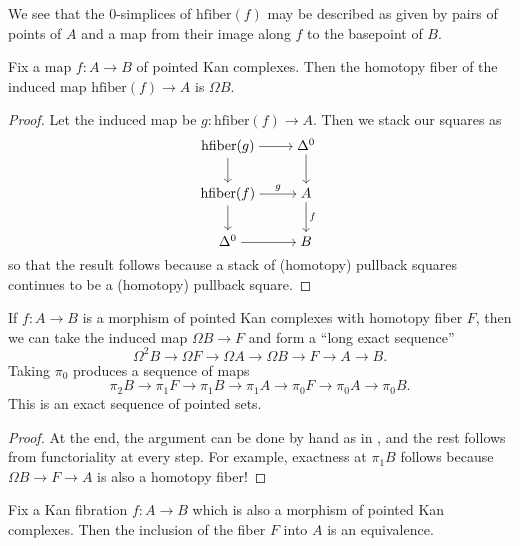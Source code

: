 \documentclass[../notes.tex]{subfiles}
\begin{document}
\begin{remark}
	We see that the $0$-simplices of $\mathrm{hfiber}(f)$ may be described as given by pairs of points of $A$ and a map from their image along $f$ to the basepoint of $B$.
\end{remark}
\begin{lemma} \label{lem:loop-as-fiber}
	Fix a map $f\colon A\to B$ of pointed Kan complexes. Then the homotopy fiber of the induced map $\mathrm{hfiber}(f)\to A$ is $\Omega B$.
\end{lemma}
\begin{proof}
	Let the induced map be $g\colon \mathrm{hfiber}(f)\to A$. Then we stack our squares as
	\[\begin{tikzcd}[cramped]
		{\mathrm{hfiber}(g)} & {\Delta^0} \\
		{\mathrm{hfiber}(f)} & A \\
		{\Delta^0} & B
		\arrow[from=1-1, to=1-2]
		\arrow[from=1-1, to=2-1]
		\arrow[from=1-2, to=2-2]
		\arrow["g", from=2-1, to=2-2]
		\arrow[from=2-1, to=3-1]
		\arrow["f", from=2-2, to=3-2]
		\arrow[from=3-1, to=3-2]
	\end{tikzcd}\]
	so that the result follows because a stack of (homotopy) pullback squares continues to be a (homotopy) pullback square.
\end{proof}
\begin{theorem}
	If $f\colon A\to B$ is a morphism of pointed Kan complexes with homotopy fiber $F$, then we can take the induced map $\Omega B\to F$ and form a ``long exact sequence''
	\[\Omega^2B\to\Omega F\to\Omega A\to\Omega B\to F\to A\to B.\]
	Taking $\pi_0$ produces a sequence of maps
	\[\pi_2B\to\pi_1F\to\pi_1B\to\pi_1A\to\pi_0F\to\pi_0A\to\pi_0B.\]
	This is an exact sequence of pointed sets.
\end{theorem}
\begin{proof}
	At the end, the argument can be done by hand as in , and the rest follows from functoriality at every step. For example, exactness at $\pi_1B$ follows because $\Omega B\to F\to A$ is also a homotopy fiber!
\end{proof}
\begin{theorem}
	Fix a Kan fibration $f\colon A\to B$ which is also a morphism of pointed Kan complexes. Then the inclusion of the fiber $F$ into $A$ is an equivalence.
\end{theorem}
\end{document}
